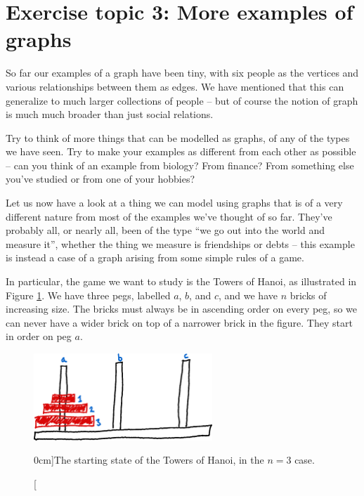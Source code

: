 \documentclass[nobib]{tufte-handout}
\begin{document}
\section{Exercise topic 3: More examples of graphs}

So far our examples of a graph have been tiny, with six people as the vertices and various relationships between them as edges. We have mentioned that this can generalize to much larger collections of people -- but of course the notion of graph is much much broader than just social relations.

\begin{xca}
  Try to think of more things that can be modelled as graphs, of any of the types we have seen. Try to make your examples as different from each other as possible -- can you think of an example from biology? From finance? From something else you've studied or from one of your hobbies?
\end{xca}

Let us now have a look at a thing we can model using graphs that is of a very different nature from most of the examples we've thought of so far. They've probably all, or nearly all, been of the type ``we go out into the world and measure it'', whether the thing we measure is friendships or debts -- this example is instead a case of a graph arising from some simple rules of a game.

In particular, the game we want to study is the Towers of Hanoi, as illustrated in Figure \ref{fig:towers_of_hanoi}. We have three pegs, labelled $a$, $b$, and $c$, and we have $n$ bricks of increasing size. The bricks must always be in ascending order on every peg, so we can never have a wider brick on top of a narrower brick in the figure. They start in order on peg $a$.

\begin{figure}
  \centering
  \includegraphics[width=0.6\textwidth]{graphics/L1_exc/towers_of_hanoi.png}
  \caption[][0cm]{The starting state of the Towers of Hanoi, in the $n=3$ case.}
  \label{fig:towers_of_hanoi}
\end{figure}
\end{document}
